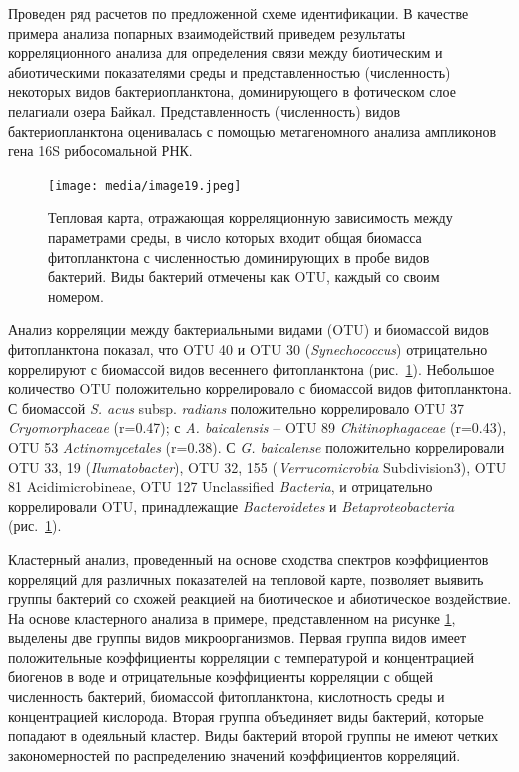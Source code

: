 \documentclass[a4paper,12pt,openany,final]{extreport}
\def\oldcaption{} \let\oldcaption=\caption
\def\caption{\stepcounter{captionsnum}\oldcaption}
\begin{document}
Проведен ряд расчетов по предложенной схеме идентификации. В качестве
примера анализа попарных взаимодействий приведем результаты
корреляционного анализа для определения связи между биотическим и
абиотическими показателями среды и представленностью (численность)
некоторых видов бактериопланктона, доминирующего в фотическом слое
пелагиали озера Байкал. Представленность (численность) видов
бактериопланктона оценивалась с помощью метагеномного анализа ампликонов
гена 16S рибосомальной РНК.

\begin{figure}\centering

\texttt{[image: media/image19.jpeg]}
\caption{Тепловая карта, отражающая корреляционную зависимость между
параметрами среды, в число которых входит общая биомасса фитопланктона с
численностью доминирующих в пробе видов бактерий. Виды бактерий отмечены
как OTU, каждый со своим номером.}\label{fig:heatmap-1}
\end{figure}

Анализ корреляции между бактериальными видами (OTU) и биомассой видов
фитопланктона показал, что OTU 40 и OTU 30 (\emph{Synechococcus})
отрицательно коррелируют с биомассой видов весеннего фитопланктона (рис.~\ref{fig:heatmap-1}). Небольшое количество OTU положительно коррелировало с биомассой
видов фитопланктона. С биомассой \emph{S. acus} subsp. \emph{radians}
положительно коррелировало OTU 37 \emph{Cryomorphaceae} (r=0.47); с
\emph{A. baicalensis} -- OTU 89 \emph{Chitinophagaceae} (r=0.43), OTU 53
\emph{Actinomycetales} (r=0.38). С \emph{G. baicalense} положительно
коррелировали OTU 33, 19 (\emph{Ilumatobacter}), OTU 32, 155
(\emph{Verrucomicrobia} Subdivision3), OTU 81 Acidimicrobineae, OTU 127
Unclassified \emph{Bacteria}, и отрицательно коррелировали OTU,
принадлежащие \emph{Bacteroidetes} и \emph{Betaproteobacteria} (рис.~\ref{fig:heatmap-1}).

Кластерный анализ, проведенный на основе сходства спектров коэффициентов корреляций для различных показателей на тепловой карте, позволяет выявить группы бактерий со схожей реакцией на биотическое и абиотическое воздействие. На основе кластерного анализа в примере, представленном на рисунке \ref{fig:heatmap-1}, выделены две группы видов микроорганизмов. Первая группа видов имеет положительные коэффициенты корреляции с температурой и концентрацией биогенов в воде и отрицательные коэффициенты корреляции с общей численность бактерий, биомассой фитопланктона, кислотность среды и концентрацией кислорода. Вторая группа объединяет виды бактерий, которые попадают в одеяльный кластер. Виды бактерий второй группы не имеют четких закономерностей по распределению значений коэффициентов корреляций.
\end{document}
